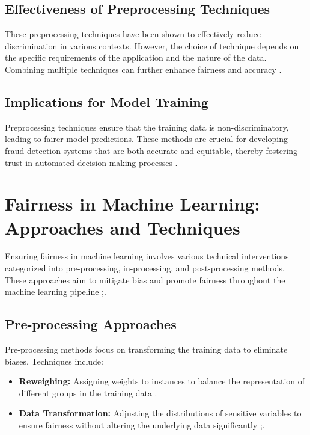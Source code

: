 \documentclass[12pt,a4paper]{report}
\begin{document}
\subsection{Effectiveness of Preprocessing Techniques}
These preprocessing techniques have been shown to effectively reduce discrimination in various contexts. However, the choice of technique depends on the specific requirements of the application and the nature of the data. Combining multiple techniques can further enhance fairness and accuracy \citep{kamiran2012data}.\\

\subsection{Implications for Model Training}
Preprocessing techniques ensure that the training data is non-discriminatory, leading to fairer model predictions. These methods are crucial for developing fraud detection systems that are both accurate and equitable, thereby fostering trust in automated decision-making processes \citep{kamiran2012data}.\\

\section{Fairness in Machine Learning: Approaches and Techniques}
Ensuring fairness in machine learning involves various technical interventions categorized into pre-processing, in-processing, and post-processing methods. These approaches aim to mitigate bias and promote fairness throughout the machine learning pipeline \citep{caton2024fairness};\citep{mehrabi2021survey}.\\


\subsection{Pre-processing Approaches}
Pre-processing methods focus on transforming the training data to eliminate biases. Techniques include:
\begin{itemize}
    \item \textbf{Reweighing:} Assigning weights to instances to balance the representation of different groups in the training data \citep{kamiran2012data}.
    \item \textbf{Data Transformation:} Adjusting the distributions of sensitive variables to ensure fairness without altering the underlying data significantly \citep{caton2024fairness};\citep{mehrabi2021survey}.
\end{itemize}
\end{document}
